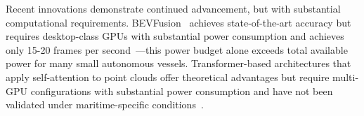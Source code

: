 \documentclass{erauthesis}
\begin{document}


Recent innovations demonstrate continued advancement, but with substantial computational requirements.
BEVFusion~\cite{liang2022, liu2023b} achieves state-of-the-art accuracy but requires desktop-class GPUs with substantial power consumption and achieves only 15-20 frames per second~\cite{liu2023b}—this power budget alone exceeds total available power for many small autonomous vessels.
Transformer-based architectures that apply self-attention to point clouds offer theoretical advantages but require multi-GPU configurations with substantial power consumption and have not been validated under maritime-specific conditions~\cite{xie2024}.
\end{document}
